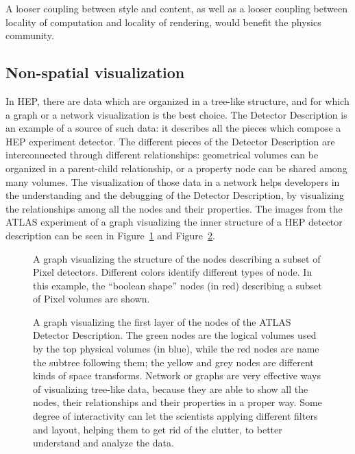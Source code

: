 \documentclass[12pt,a4paper]{article}
\begin{document}
A looser coupling between style and content, as well as a looser coupling between locality of computation and locality of rendering,
would benefit the physics community.

\hypertarget{non-spatial-visualization}{%
\subsection{Non-spatial visualization}\label{non-spatial-visualization}}

In HEP, there are data which are organized in a tree-like structure, and for which a graph or a network visualization is the best choice.
The Detector Description is an example of a source of such data: it describes all the pieces which compose a HEP experiment detector.
The different pieces of the Detector Description are interconnected through different relationships: geometrical volumes can be organized
in a parent-child relationship, or a property node can be shared among many volumes. The visualization of those data in a network helps
developers in the understanding and the debugging of the Detector Description, by visualizing the relationships among all the nodes and
their properties. The images from the ATLAS experiment \cite{ATLASGeoModel2017} of a graph visualizing the inner
structure of a HEP detector description can be seen in Figure~\ref{fig:atlasgeo1} and Figure~\ref{fig:atlasgeo2}.

\begin{figure}
\caption{A graph visualizing the structure of the nodes describing a subset of Pixel detectors.
Different colors identify different types of node. In this example, the “boolean shape” nodes (in red) describing a subset of Pixel volumes are shown.}
\label{fig:atlasgeo1}
\end{figure}

\begin{figure}
\caption{A graph visualizing the first layer of the nodes of the ATLAS Detector Description.
The green nodes are the logical volumes used by the top physical volumes (in blue), while the red nodes are name
the subtree following them; the yellow and grey nodes are different kinds of space transforms. Network or graphs are
very effective ways of visualizing tree-like data, because they are able to show all the 	nodes, their relationships and
their properties in a proper way. Some degree of interactivity can let the scientists applying different filters and layout,
helping them to get rid of the clutter, to better understand and analyze the data.}
\label{fig:atlasgeo2}
\end{figure}
\end{document}
